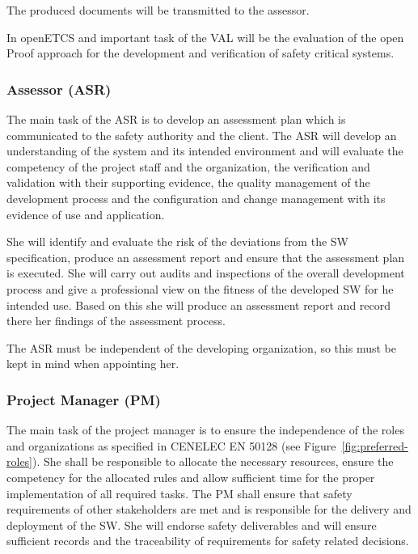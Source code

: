 The produced documents will be transmitted to the assessor.

In openETCS and important task of the VAL will be the evaluation of the open
Proof approach for the development and verification of safety critical systems.

\subsubsection{Assessor (ASR)}
\label{sec:assessor}

The main task of the ASR is to develop an assessment plan which is communicated
to the safety authority and the client. The ASR will develop an understanding of
the system and its intended environment and will evaluate the competency of the
project staff and the organization, the verification and validation with their
supporting evidence, the quality management of the development process and the
configuration and change management with its evidence of use and application.

She will identify and evaluate the risk of the deviations from the SW
specification, produce an assessment report and ensure that the assessment plan
is executed. She will carry out audits and inspections of the overall
development process and give a professional view on the fitness of the developed
SW for he intended use. Based on this she will produce an assessment report and
record there her findings of the assessment process.

The ASR must be independent of the developing organization, so this must be kept
in mind when appointing her.

\subsubsection{Project Manager (PM)}
\label{sec:project-manager}

The main task of the project manager is to ensure the independence of the roles
and organizations as specified in CENELEC EN 50128 (see
Figure~\ref{fig:preferred-roles}). She shall be responsible to allocate the
necessary resources, ensure the competency for the allocated rules and allow
sufficient time for the proper implementation of all required tasks. The PM
shall ensure that safety requirements of other stakeholders are met and is
responsible for the delivery and deployment of the SW. She will endorse safety
deliverables and will ensure sufficient records and the traceability of
requirements for safety related decisions.

